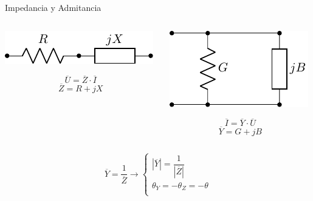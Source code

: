 \documentclass[aspectratio=169, usenames,svgnames,dvipsnames]{beamer}
\begin{document}
\begin{frame}[label={sec:org33e4549}]{Impedancia y Admitancia}
\begin{columns}
\begin{column}{0.5\columnwidth}
\begin{center}
\includegraphics[height=0.1\textheight]{../figs/Z.pdf}
\end{center}
\[
  \overline{U} = \overline{Z} \cdot \overline{I}
\]
\[
  \overline{Z} = R + j X
\]
\end{column}

\begin{column}{0.5\columnwidth}
\begin{center}
\includegraphics[height=0.25\textheight]{../figs/Y.pdf}
\end{center}
\[
  \overline{I} = \overline{Y} \cdot \overline{U}
\]
\[
  \overline{Y} = G + j B
\]
\end{column}
\end{columns}

\[
\boxed{
  \overline{Y} = \frac{1}{\overline{Z}} \rightarrow \left\{%
    \begin{array}{l}
    |\overline{Y}| = \dfrac{1}{|\overline{Z}|}\\[12pt]
    \theta_Y = -\theta_Z = - \theta\\
    \end{array}\right.
      }
\]
\end{frame}
\end{document}
